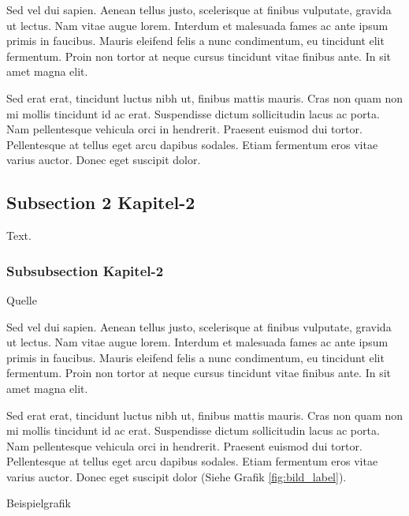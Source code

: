 Sed vel dui sapien. Aenean tellus justo, scelerisque at finibus vulputate, gravida ut lectus. Nam vitae augue lorem. Interdum et malesuada fames ac ante ipsum primis in faucibus. Mauris eleifend felis a nunc condimentum, eu tincidunt elit fermentum. Proin non tortor at neque cursus tincidunt vitae finibus ante. In sit amet magna elit.

Sed erat erat, tincidunt luctus nibh ut, finibus mattis mauris. Cras non quam non mi mollis tincidunt id ac erat. Suspendisse dictum sollicitudin lacus ac porta. Nam pellentesque vehicula orci in hendrerit. Praesent euismod dui tortor. Pellentesque at tellus eget arcu dapibus sodales. Etiam fermentum eros vitae varius auctor. Donec eget suscipit dolor. 

\subsection{Subsection 2 Kapitel-2}

Text.

\subsubsection{Subsubsection Kapitel-2}

Quelle \cite{trajektorenVRDemo}

Sed vel dui sapien. Aenean tellus justo, scelerisque at finibus vulputate, gravida ut lectus. Nam vitae augue lorem. Interdum et malesuada fames ac ante ipsum primis in faucibus. Mauris eleifend felis a nunc condimentum, eu tincidunt elit fermentum. Proin non tortor at neque cursus tincidunt vitae finibus ante. In sit amet magna elit.

Sed erat erat, tincidunt luctus nibh ut, finibus mattis mauris. Cras non quam non mi mollis tincidunt id ac erat. Suspendisse dictum sollicitudin lacus ac porta. Nam pellentesque vehicula orci in hendrerit. Praesent euismod dui tortor. Pellentesque at tellus eget arcu dapibus sodales. Etiam fermentum eros vitae varius auctor. Donec eget suscipit dolor (Siehe Grafik \ref{fig:bild_label}). 

Beispielgrafik

